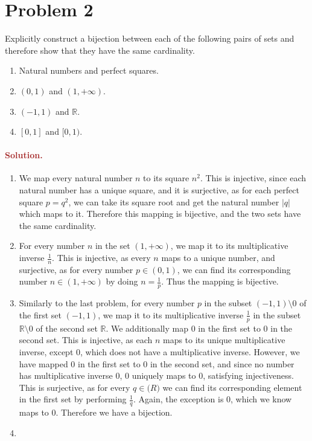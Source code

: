 \section*{Problem 2}
Explicitly construct a bijection between each of the following pairs of sets and therefore show that they have the same cardinality.
\begin{enumerate}
    \item Natural numbers and perfect squares.
    \item $(0, 1)$ and $(1, +\infty)$.
    \item $(-1, 1)$ and $\mathbb{R}$.
    \item $[0, 1]$ and $[0, 1)$.
\end{enumerate}


\paragraph{\textcolor{brown}{Solution.}}
\begin{enumerate}
    \item We map every natural number $n$ to its square $n^2$. This is injective, since each natural number has a unique square, and it is surjective, as for each perfect square $p = q^2$, we can take its square root and get the natural number $|q|$ which maps to it. Therefore this mapping is bijective, and the two sets have the same cardinality.
    \item For every number $n$ in the set $(1, +\infty)$, we map it to its multiplicative inverse $\frac{1}{n}$. This is injective, as every $n$ maps to a unique number, and surjective, as for every number $p \in (0, 1)$, we can find its corresponding number $n \in (1, +\infty)$ by doing $n=\frac{1}{p}$. Thus the mapping is bijective.
    \item Similarly to the last problem, for every number $p$ in the subset $(-1, 1) \setminus 0$ of the first set $(-1, 1)$, we map it to its multiplicative inverse $\frac{1}{p}$ in the subset $\mathbb{R} \setminus 0$ of the second set $\mathbb{R}$. We additionally map $0$ in the first set to $0$ in the second set. This is injective, as each $n$ maps to its unique multiplicative inverse, except 0, which does not have a multiplicative inverse. However, we have mapped 0 in the first set to 0 in the second set, and since no number has multiplicative inverse 0, 0 uniquely maps to 0, satisfying injectiveness. This is surjective, as for every $q \in \mathbb(R)$ we can find its corresponding element in the first set by performing $\frac{1}{q}$. Again, the exception is 0, which we know maps to 0. Therefore we have a bijection.
    \item 
\end{enumerate}



